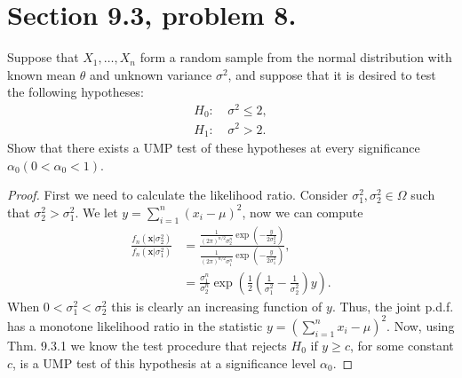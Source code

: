 \documentclass{article}
\newcommand{\randsamp}{X_1,\dots,X_n}
\newcommand{\pdf}{p.d.f. }
\newenvironment{hwproof}[1]
{
    #1
    \begin{proof}
}{
    \end{proof}
}
\begin{document}
\section{Section 9.3, problem 8.}
\begin{hwproof}
    {
        Suppose that $\randsamp$ form a random sample from the normal distribution with known
        mean $\theta$ and unknown variance $\sigma^2$, and suppose that it is desired to test
        the following hypotheses:
        \begin{align*}
            H_0 : & \ \sigma^2 \leq 2, \\
            H_1 : & \ \sigma^2 > 2.
        \end{align*}
        Show that there exists a UMP test of these hypotheses at every significance
        $\alpha_0 (0 < \alpha_0 < 1)$.
    }
    First we need to calculate the likelihood ratio. Consider $\sigma_1^2, \sigma_2^2 \in \Omega$
    such that $\sigma_2^2 > \sigma_1^2$. We let $y = \sum_{i=1}^n (x_i - \mu)^2$, now we can compute
    \begin{align*}
        \frac{f_n(\bm{x}|\sigma_2^2)}{f_n(\bm{x}|\sigma_1^2)} & =
        \frac{\frac{1}{(2\pi)^{n/2}\sigma_2^n}\exp(-\frac{y}{2\sigma_2^2})}{\frac{1}{(2\pi)^{n/2}\sigma_1^n}\exp(-\frac{y}{2\sigma_1^2})},                                            \\
                                                              & = \frac{\sigma_1^n}{\sigma_2^n}\exp\left(\frac{1}{2}\left(\frac{1}{\sigma_1^2} - \frac{1}{\sigma_2^2}\right)y\right).
    \end{align*}
    When $0 < \sigma_1^2 < \sigma_2^2$ this is clearly an increasing function of $y$.
    Thus, the joint \pdf has a monotone likelihood ratio in the statistic
    $y = (\sum_{i=1}^nx_i - \mu)^2$. Now, using Thm. 9.3.1 we know the test procedure
    that rejects $H_0$ if $y \geq c$, for some constant $c$, is a UMP test of this
    hypothesis at a significance level $\alpha_0$.
\end{hwproof}
\end{document}
